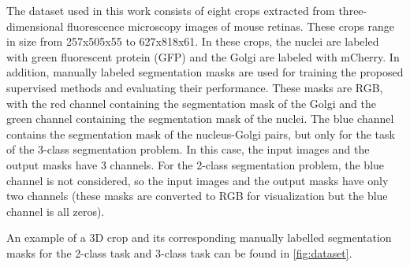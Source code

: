 The dataset used in this work consists of eight crops extracted from three-dimensional fluorescence microscopy images of mouse retinas. These crops range in size from 257x505x55 to 627x818x61. In these crops, the nuclei are labeled with green fluorescent protein (GFP) and the Golgi are labeled with mCherry. In addition, manually labeled segmentation masks are used for training the proposed supervised methods and evaluating their performance. These masks are RGB, with the red channel containing the segmentation mask of the Golgi and the green channel containing the segmentation mask of the nuclei. The blue channel contains the segmentation mask of the nucleus-Golgi pairs, but only for the task of the 3-class segmentation problem. In this case, the input images and the output masks have 3 channels. For the 2-class segmentation problem, the blue channel is not considered, so the input images and the output masks have only two channels (these masks are converted to RGB for visualization but the blue channel is all zeros).

An example of a 3D crop and its corresponding manually labelled segmentation masks for the 2-class task and 3-class task can be found in \ref{fig:dataset}.


